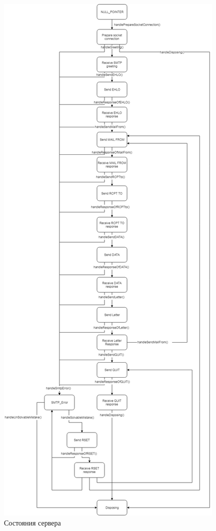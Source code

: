 \documentclass[a4paper,12pt]{report}
\begin{document}
\begin{figure}
\centering
\includegraphics[height=\textheight]{static/ClientDiagram_Final.jpg}
\caption{Состояния сервера}
\label{fig:fsm}
\end{figure}
\end{document}
